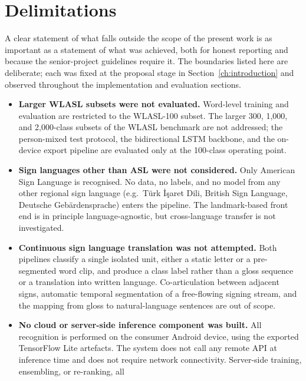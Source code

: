 \section{Delimitations}
\label{sec:conclusion-not-done}

A clear statement of what falls outside the scope of the present
work is as important as a statement of what was achieved, both for
honest reporting and because the senior-project guidelines require
it. The boundaries listed here are deliberate; each was fixed at
the proposal stage in
Section~\ref{ch:introduction} and observed throughout the
implementation and evaluation sections.

\begin{itemize}
  \item \textbf{Larger WLASL subsets were not evaluated.}
        Word-level training and evaluation are restricted to the
        WLASL-100 subset. The larger 300, 1{,}000, and 2{,}000-class
        subsets of the WLASL benchmark are not addressed; the
        person-mixed test protocol, the bidirectional LSTM
        backbone, and the on-device export pipeline are evaluated
        only at the 100-class operating point.
  \item \textbf{Sign languages other than ASL were not considered.}
        Only American Sign Language is recognised. No data, no
        labels, and no model from any other regional sign language
        (e.g.\ T\"urk \.I\c{s}aret Dili, British Sign Language,
        Deutsche Geb\"ardensprache) enters the pipeline. The
        landmark-based front end is in principle language-agnostic,
        but cross-language transfer is not investigated.
  \item \textbf{Continuous sign language translation was not
        attempted.} Both pipelines classify a single isolated
        unit, either a static letter or a pre-segmented word clip,
        and produce a class label rather than a gloss sequence or a
        translation into written language. Co-articulation between
        adjacent signs, automatic temporal segmentation of a
        free-flowing signing stream, and the mapping from gloss to
        natural-language sentences are out of scope.
  \item \textbf{No cloud or server-side inference component was
        built.} All recognition is performed on the consumer
        Android device, using the exported TensorFlow Lite
        artefacts. The system does not call any remote API at
        inference time and does not require network connectivity.
        Server-side training, ensembling, or re-ranking, all

\end{itemize}
